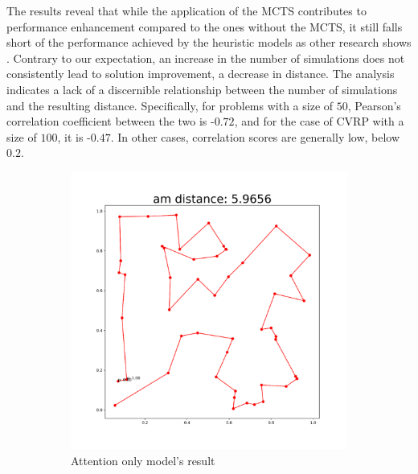 \documentclass{article}
\begin{document}
The results reveal that while the application of the MCTS contributes to performance enhancement compared to the ones without the MCTS, it still falls short of the performance achieved by the heuristic models as other research shows \cite{kwonPOMOPolicyOptimization2021, kool2018attention}. Contrary to our expectation, an increase in the number of simulations does not consistently lead to solution improvement, a decrease in distance. The analysis indicates a lack of a discernible relationship between the number of simulations and the resulting distance. Specifically, for problems with a size of $50$, Pearson's correlation coefficient between the two is $\mbox{-}0.72$, and for the case of CVRP with a size of $100$, it is $\mbox{-}0.47$. In other cases, correlation scores are generally low, below $0.2$.

\begin{figure}
    \begin{center}
        \begin{subfigure}[b]{0.49\linewidth}
        \centering
         \includegraphics[width=\linewidth]{figures/AM result.png}
         \caption{Attention only model's result}
         \label{fig:AM-result}
        \end{subfigure}
        \hfill
        \begin{subfigure}[b]{0.49\linewidth}
            \centering

\end{subfigure}
\end{center}
\end{figure}
\end{document}
